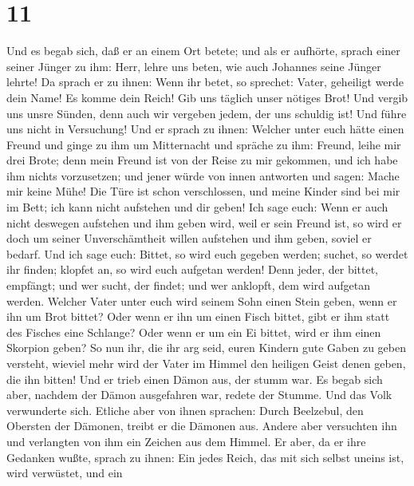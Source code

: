 \hypertarget{section-10}{%
\section{11}\label{section-10}}

 Und es begab sich, daß er an einem Ort betete; und als er
aufhörte, sprach einer seiner Jünger zu ihm: Herr, lehre uns beten, wie
auch Johannes seine Jünger lehrte!  Da sprach er zu ihnen:
Wenn ihr betet, so sprechet: Vater, geheiligt werde dein Name! Es komme
dein Reich!  Gib uns täglich unser nötiges Brot!
 Und vergib uns unsre Sünden, denn auch wir vergeben
jedem, der uns schuldig ist! Und führe uns nicht in Versuchung!
 Und er sprach zu ihnen: Welcher unter euch hätte einen
Freund und ginge zu ihm um Mitternacht und spräche zu ihm: Freund, leihe
mir drei Brote;  denn mein Freund ist von der Reise zu mir
gekommen, und ich habe ihm nichts vorzusetzen;  und jener
würde von innen antworten und sagen: Mache mir keine Mühe! Die Türe ist
schon verschlossen, und meine Kinder sind bei mir im Bett; ich kann
nicht aufstehen und dir geben!  Ich sage euch: Wenn er
auch nicht deswegen aufstehen und ihm geben wird, weil er sein Freund
ist, so wird er doch um seiner Unverschämtheit willen aufstehen und ihm
geben, soviel er bedarf.  Und ich sage euch: Bittet, so
wird euch gegeben werden; suchet, so werdet ihr finden; klopfet an, so
wird euch aufgetan werden!  Denn jeder, der bittet,
empfängt; und wer sucht, der findet; und wer anklopft, dem wird aufgetan
werden.  Welcher Vater unter euch wird seinem Sohn einen
Stein geben, wenn er ihn um Brot bittet? Oder wenn er ihn um einen Fisch
bittet, gibt er ihm statt des Fisches eine Schlange? 
Oder wenn er um ein Ei bittet, wird er ihm einen Skorpion geben?
 So nun ihr, die ihr arg seid, euren Kindern gute Gaben
zu geben versteht, wieviel mehr wird der Vater im Himmel den heiligen
Geist denen geben, die ihn bitten!  Und er trieb einen
Dämon aus, der stumm war. Es begab sich aber, nachdem der Dämon
ausgefahren war, redete der Stumme. Und das Volk verwunderte sich.
 Etliche aber von ihnen sprachen: Durch Beelzebul, den
Obersten der Dämonen, treibt er die Dämonen aus.  Andere
aber versuchten ihn und verlangten von ihm ein Zeichen aus dem Himmel.
 Er aber, da er ihre Gedanken wußte, sprach zu ihnen: Ein
jedes Reich, das mit sich selbst uneins ist, wird verwüstet, und ein
